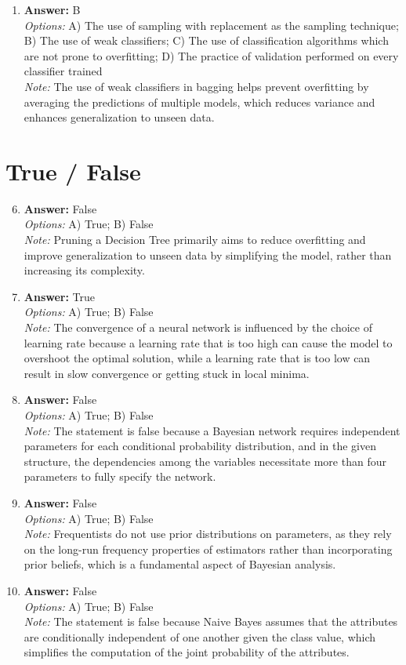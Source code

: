 \documentclass[12pt]{article}
\begin{document}
\begin{enumerate}[label=\arabic*.]
\item \textbf{Answer:} B
\\ \textit{Options:} A) The use of sampling with replacement as the sampling technique; B) The use of weak classifiers; C) The use of classification algorithms which are not prone to overfitting; D) The practice of validation performed on every classifier trained
\\ \textit{Note:} The use of weak classifiers in bagging helps prevent overfitting by averaging the predictions of multiple models, which reduces variance and enhances generalization to unseen data.
\end{enumerate}

\section*{True / False}
\begin{enumerate}[label=\arabic*.]
\setcounter{enumi}{5}
\item \textbf{Answer:} False
\\ \textit{Options:} A) True; B) False
\\ \textit{Note:} Pruning a Decision Tree primarily aims to reduce overfitting and improve generalization to unseen data by simplifying the model, rather than increasing its complexity.
\item \textbf{Answer:} True
\\ \textit{Options:} A) True; B) False
\\ \textit{Note:} The convergence of a neural network is influenced by the choice of learning rate because a learning rate that is too high can cause the model to overshoot the optimal solution, while a learning rate that is too low can result in slow convergence or getting stuck in local minima.
\item \textbf{Answer:} False
\\ \textit{Options:} A) True; B) False
\\ \textit{Note:} The statement is false because a Bayesian network requires independent parameters for each conditional probability distribution, and in the given structure, the dependencies among the variables necessitate more than four parameters to fully specify the network.
\item \textbf{Answer:} False
\\ \textit{Options:} A) True; B) False
\\ \textit{Note:} Frequentists do not use prior distributions on parameters, as they rely on the long-run frequency properties of estimators rather than incorporating prior beliefs, which is a fundamental aspect of Bayesian analysis.
\item \textbf{Answer:} False
\\ \textit{Options:} A) True; B) False
\\ \textit{Note:} The statement is false because Naive Bayes assumes that the attributes are conditionally independent of one another given the class value, which simplifies the computation of the joint probability of the attributes.
\end{enumerate}
\end{document}
